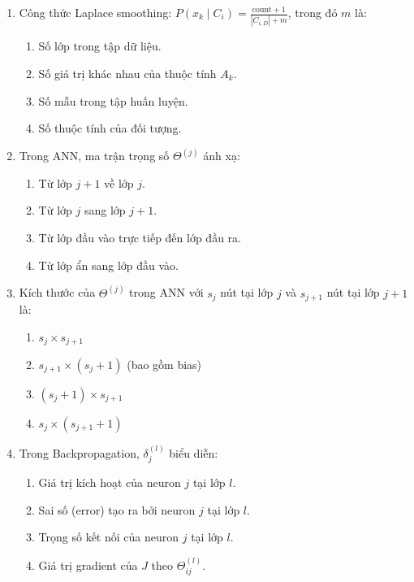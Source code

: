 \documentclass[10pt]{article}
\begin{document}
\begin{enumerate}[leftmargin=*, label=\textbf{Câu \arabic*.}]
    \item Công thức Laplace smoothing: $P(x_k \mid C_i) = \frac{\text{count} + 1}{|C_{i,D}| + m}$, trong đó $m$ là:
    \begin{enumerate}[label=\Alph*.]
        \item Số lớp trong tập dữ liệu.
        \item Số giá trị khác nhau của thuộc tính $A_k$.
        \item Số mẫu trong tập huấn luyện.
        \item Số thuộc tính của đối tượng.
    \end{enumerate}

    \item Trong ANN, ma trận trọng số $\Theta^{(j)}$ ánh xạ:
    \begin{enumerate}[label=\Alph*.]
        \item Từ lớp $j+1$ về lớp $j$.
        \item Từ lớp $j$ sang lớp $j+1$.
        \item Từ lớp đầu vào trực tiếp đến lớp đầu ra.
        \item Từ lớp ẩn sang lớp đầu vào.
    \end{enumerate}

    \item Kích thước của $\Theta^{(j)}$ trong ANN với $s_j$ nút tại lớp $j$ và $s_{j+1}$ nút tại lớp $j+1$ là:
    \begin{enumerate}[label=\Alph*.]
        \item $s_j \times s_{j+1}$
        \item $s_{j+1} \times (s_j + 1)$ (bao gồm bias)
        \item $(s_j + 1) \times s_{j+1}$
        \item $s_j \times (s_{j+1} + 1)$
    \end{enumerate}

    \item Trong Backpropagation, $\delta^{(l)}_j$ biểu diễn:
    \begin{enumerate}[label=\Alph*.]
        \item Giá trị kích hoạt của neuron $j$ tại lớp $l$.
        \item Sai số (error) tạo ra bởi neuron $j$ tại lớp $l$.
        \item Trọng số kết nối của neuron $j$ tại lớp $l$.
        \item Giá trị gradient của $J$ theo $\Theta^{(l)}_{ij}$.
    \end{enumerate}


\end{enumerate}
\end{document}
